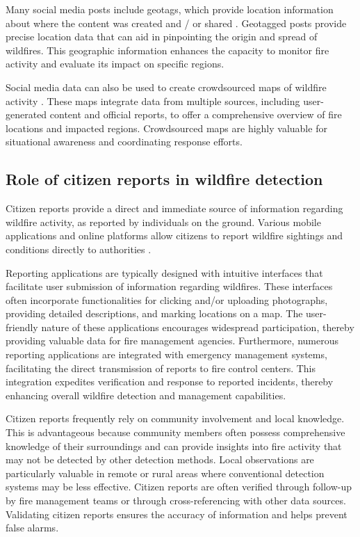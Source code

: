 \documentclass[
  12 pt,
]{Nemilov}
\begin{document}
Many social media posts include geotags, which provide location information about where the content was created and / or shared \citep{crampton2013beyond}. Geotagged posts provide precise location data that can aid in pinpointing the origin and spread of wildfires. This geographic information enhances the capacity to monitor fire activity and evaluate its impact on specific regions.

Social media data can also be used to create crowdsourced maps of wildfire activity \citep{bogdos2019crowd, zhong2016real}. These maps integrate data from multiple sources, including user-generated content and official reports, to offer a comprehensive overview of fire locations and impacted regions. Crowdsourced maps are highly valuable for situational awareness and coordinating response efforts.

\subsection{Role of citizen reports in wildfire detection}\label{role-of-citizen-reports-in-wildfire-detection}

Citizen reports provide a direct and immediate source of information regarding wildfire activity, as reported by individuals on the ground. Various mobile applications and online platforms allow citizens to report wildfire sightings and conditions directly to authorities \citep{athanasis2015aegis, monedero2019predicting, nayebi2017crowdsourced}.

Reporting applications are typically designed with intuitive interfaces that facilitate user submission of information regarding wildfires. These interfaces often incorporate functionalities for clicking and/or uploading photographs, providing detailed descriptions, and marking locations on a map. The user-friendly nature of these applications encourages widespread participation, thereby providing valuable data for fire management agencies. Furthermore, numerous reporting applications are integrated with emergency management systems, facilitating the direct transmission of reports to fire control centers. This integration expedites verification and response to reported incidents, thereby enhancing overall wildfire detection and management capabilities.

Citizen reports frequently rely on community involvement and local knowledge. This is advantageous because community members often possess comprehensive knowledge of their surroundings and can provide insights into fire activity that may not be detected by other detection methods. Local observations are particularly valuable in remote or rural areas where conventional detection systems may be less effective. Citizen reports are often verified through follow-up by fire management teams or through cross-referencing with other data sources. Validating citizen reports ensures the accuracy of information and helps prevent false alarms.
\end{document}
